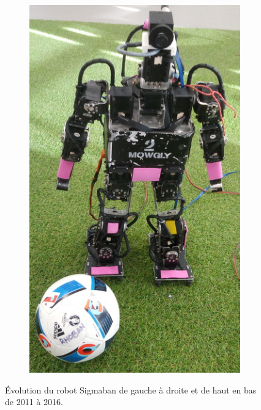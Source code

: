 \begin{figure}[htb]
\begin{subfigure}{0.3\paperwidth}
        \includegraphics[width=0.915\linewidth]{../media/sigmaban_1_5_crop.jpg}
    \end{subfigure}
    \caption{\label{fig:robot_sigmaban_evolution} 
        Évolution du robot Sigmaban de gauche à droite et de haut en bas de 2011 à 2016.
    }
\end{figure}

